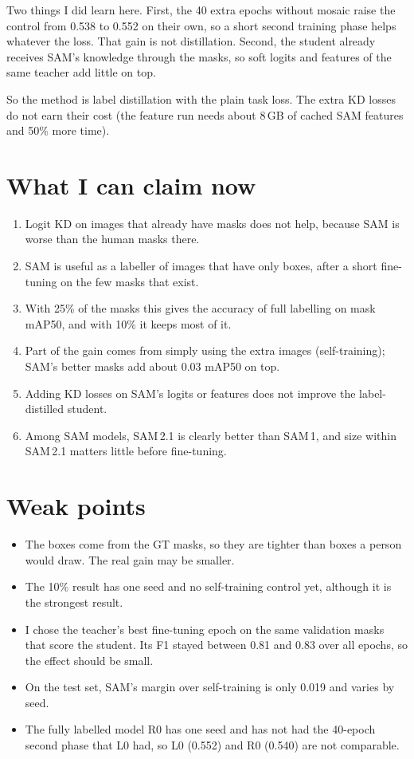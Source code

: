 \documentclass[11pt,a4paper]{article}
\begin{document}
Two things I did learn here. First, the 40 extra epochs without mosaic raise the control from 0.538 to 0.552 on their own, so a short
second training phase helps whatever the loss. That gain is not distillation. Second, the student already receives SAM's knowledge through
the masks, so soft logits and features of the same teacher add little on top.

So the method is label distillation with the plain task loss. The extra KD losses do not earn their cost (the feature run needs about 8\,GB
of cached SAM features and 50\% more time).

\section{What I can claim now}
\begin{enumerate}
\item Logit KD on images that already have masks does not help, because SAM is worse than the human masks there.
\item SAM is useful as a labeller of images that have only boxes, after a short fine-tuning on the few masks that exist.
\item With 25\% of the masks this gives the accuracy of full labelling on mask mAP50, and with 10\% it keeps most of it.
\item Part of the gain comes from simply using the extra images (self-training); SAM's better masks add about 0.03 mAP50 on top.
\item Adding KD losses on SAM's logits or features does not improve the label-distilled student.
\item Among SAM models, SAM\,2.1 is clearly better than SAM\,1, and size within SAM\,2.1 matters little before fine-tuning.
\end{enumerate}

\section{Weak points}
\begin{itemize}
\item The boxes come from the GT masks, so they are tighter than boxes a person would draw. The real gain may be smaller.
\item The 10\% result has one seed and no self-training control yet, although it is the strongest result.
\item I chose the teacher's best fine-tuning epoch on the same validation masks that score the student. Its F1 stayed between 0.81 and 0.83 over
all epochs, so the effect should be small.
\item On the test set, SAM's margin over self-training is only 0.019 and varies by seed.
\item The fully labelled model R0 has one seed and has not had the 40-epoch second phase that L0 had, so L0 (0.552) and R0 (0.540) are not comparable.
\end{itemize}
\end{document}
